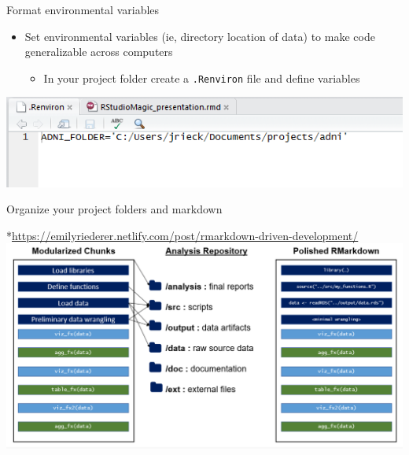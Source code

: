 \documentclass[
  ignorenonframetext,
]{beamer}
\providecommand{\tightlist}{%
  \setlength{\itemsep}{0pt}\setlength{\parskip}{0pt}}
\begin{document}
\begin{frame}[fragile]{Format environmental variables}
\protect\hypertarget{format-environmental-variables}{}

\begin{itemize}
\tightlist
\item
  Set environmental variables (ie, directory location of data) to make
  code generalizable across computers

  \begin{itemize}
  \tightlist
  \item
    In your project folder create a \texttt{.Renviron} file and define
    variables
  \end{itemize}
\end{itemize}

\includegraphics{../external/images/setup_3_rstudio_project_environ.PNG}

\end{frame}

\begin{frame}{Organize your project folders and markdown}
\protect\hypertarget{organize-your-project-folders-and-markdown}{}

*\url{https://emilyriederer.netlify.com/post/rmarkdown-driven-development/}
\includegraphics{../external/images/setup_4_markdown_project.PNG}

\end{frame}
\end{document}
